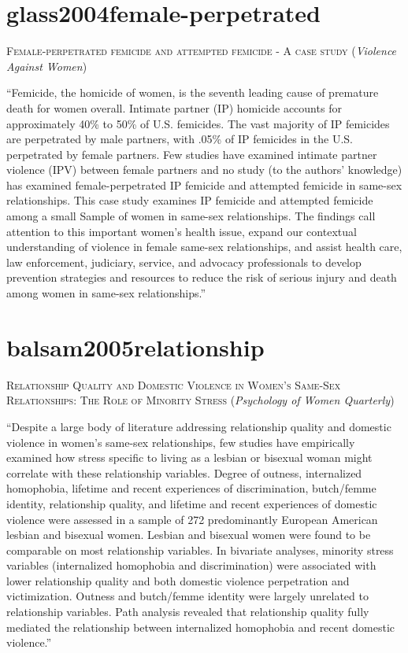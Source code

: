 \documentclass[]{tufte-handout}
\begin{document}
\section{\texorpdfstring{\textcolor[HTML]{5b0057}{glass2004female-perpetrated}}{}}\label{section-30}

\textsc{\large{Female-perpetrated femicide and attempted femicide - A case study}}
(\emph{Violence Against Women})

``Femicide, the homicide of women, is the seventh leading cause of
premature death for women overall. Intimate partner (IP) homicide
accounts for approximately 40\% to 50\% of U.S. femicides. The vast
majority of IP femicides are perpetrated by male partners, with .05\% of
IP femicides in the U.S. perpetrated by female partners. Few studies
have examined intimate partner violence (IPV) between female partners
and no study (to the authors' knowledge) has examined female-perpetrated
IP femicide and attempted femicide in same-sex relationships. This case
study examines IP femicide and attempted femicide among a small Sample
of women in same-sex relationships. The findings call attention to this
important women's health issue, expand our contextual understanding of
violence in female same-sex relationships, and assist health care, law
enforcement, judiciary, service, and advocacy professionals to develop
prevention strategies and resources to reduce the risk of serious injury
and death among women in same-sex relationships.''

\section{\texorpdfstring{\textcolor[HTML]{5b0057}{balsam2005relationship}}{}}\label{section-31}

\textsc{\large{Relationship Quality and Domestic Violence in Women's Same-Sex Relationships: The Role of Minority Stress}}
(\emph{Psychology of Women Quarterly})

``Despite a large body of literature addressing relationship quality and
domestic violence in women's same-sex relationships, few studies have
empirically examined how stress specific to living as a lesbian or
bisexual woman might correlate with these relationship variables. Degree
of outness, internalized homophobia, lifetime and recent experiences of
discrimination, butch/femme identity, relationship quality, and lifetime
and recent experiences of domestic violence were assessed in a sample of
272 predominantly European American lesbian and bisexual women. Lesbian
and bisexual women were found to be comparable on most relationship
variables. In bivariate analyses, minority stress variables
(internalized homophobia and discrimination) were associated with lower
relationship quality and both domestic violence perpetration and
victimization. Outness and butch/femme identity were largely unrelated
to relationship variables. Path analysis revealed that relationship
quality fully mediated the relationship between internalized homophobia
and recent domestic violence.''
\end{document}
